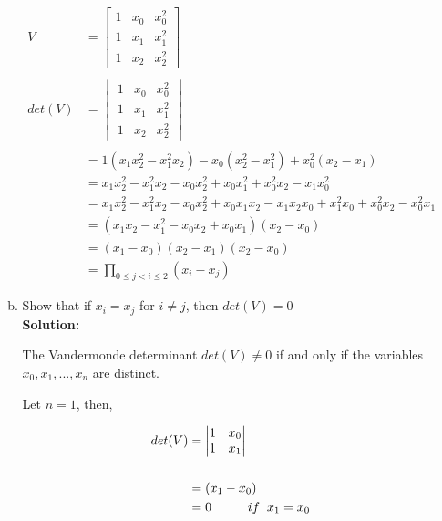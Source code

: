 \documentclass{article}
\begin{document}
\begin{enumerate}
\begin{enumerate}[(a)]
        \begin{align*}
        V &= \begin{bmatrix}
            1 & x_{0} & x_{0}^{2}\\
            1 & x_{1} & x_{1}^{2}\\
            1 & x_{2} & x_{2}^{2}
        \end{bmatrix} \\ \\
        det(V) &= \begin{vmatrix}
            1 & x_{0} & x_{0}^{2}\\
            1 & x_{1} & x_{1}^{2}\\
            1 & x_{2} & x_{2}^{2}
        \end{vmatrix} \\ \\
        &= 1(x_{1} x_{2}^{2} - x_{1}^{2} x_{2}) - x_{0}(x_{2}^{2} - x_{1}^{2}) + x_{0}^{2}(x_{2} - x_{1}) \\
        &= x_{1} x_{2}^{2} - x_{1}^{2} x_{2} - x_{0} x_{2}^{2} + x_{0} x_{1}^{2} + x_{0}^{2} x_{2} - x_{1} x_{0}^{2} \\
        &= x_{1} x_{2}^{2} - x_{1}^{2} x_{2} - x_{0} x_{2}^{2} + x_{0} x_{1} x_{2} - x_{1} x_{2} x_{0} + x_{1}^{2} x_{0} + x_{0}^{2} x_{2} - x_{0}^{2} x_{1} \\
        &= (x_{1} x_{2} - x_{1}^{2} - x_{0} x_{2} + x_{0} x_{1}) (x_{2} - x_{0}) \\
        &= (x_{1} - x_{0}) (x_{2} - x_{1}) (x_{2} - x_{0}) \\
        &= \displaystyle \prod_{0 \leq j < i \leq 2} (x_{i} - x_{j}) 
        \end{align*}


\item Show that if $x_{i} = x_{j}$ for $i \neq j$, then $det(V) = 0$ \\

\textbf{Solution:}

        The Vandermonde determinant $det(V) \neq 0$ if and only if the variables $x_{0}, x_{1}, ..., x_{n}$ are distinct.

        Let $n = 1$, then,

        \begin{align*}
        det(V) &= \begin{vmatrix}
            1 & x_{0} \\
            1 & x_{1} \\
        \end{vmatrix} \\ \\
            &= (x_{1} - x_{0}) \\
            &= 0 \hspace{1cm} if \hspace{0.2cm} x_{1} = x_{0}
        \end{align*}


\end{enumerate}
\end{enumerate}
\end{document}
